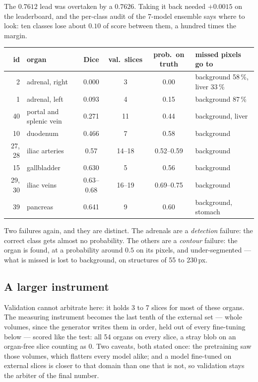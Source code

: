 \documentclass{article}
\begin{document}
The $0.7612$ lead was overtaken by a $0.7626$. Taking it back needed $+0.0015$ on
the leaderboard, and the per-class audit of the 7-model ensemble says where to
look: ten classes lose about $0.10$ of score between them, a hundred times the
margin.

\begin{center}
\small
\begin{tabular}{rlcccl}
\hline
\textbf{id} & \textbf{organ} & \textbf{Dice} & \textbf{val.\ slices} & \textbf{prob.\ on truth} & \textbf{missed pixels go to} \\
\hline
2 & adrenal, right & 0.000 & 3 & 0.00 & background 58\,\%, liver 33\,\% \\
1 & adrenal, left & 0.093 & 4 & 0.15 & background 87\,\% \\
40 & portal and splenic vein & 0.271 & 11 & 0.44 & background, liver \\
10 & duodenum & 0.466 & 7 & 0.58 & background \\
27, 28 & iliac arteries & 0.57 & 14--18 & 0.52--0.59 & background \\
15 & gallbladder & 0.630 & 5 & 0.56 & background \\
29, 30 & iliac veins & 0.63--0.68 & 16--19 & 0.69--0.75 & background \\
39 & pancreas & 0.641 & 9 & 0.60 & background, stomach \\
\hline
\end{tabular}
\end{center}

\noindent Two failures again, and they are distinct. The adrenals are a
\emph{detection} failure: the correct class gets almost no probability. The
others are a \emph{contour} failure: the organ is found, at a probability around
$0.5$ on its pixels, and under-segmented --- what is missed is lost to
background, on structures of 55 to 230\,px.

\subsection{A larger instrument}

Validation cannot arbitrate here: it holds 3 to 7 slices for most of these
organs. The measuring instrument becomes the last tenth of the external set
--- whole volumes, since the generator writes them in order, held out of every
fine-tuning below --- scored like the test: all 54 organs on every slice, a stray
blob on an organ-free slice counting as 0. Two caveats, both stated once: the
pretraining saw those volumes, which flatters every model alike; and a model
fine-tuned on external slices is closer to that domain than one that is not, so
validation stays the arbiter of the final number.
\end{document}
